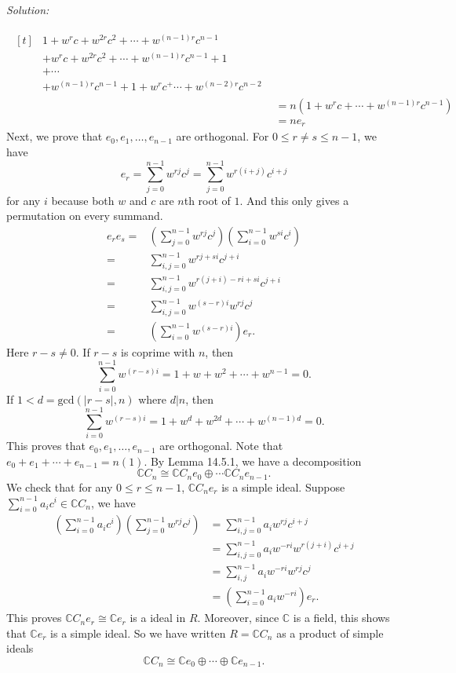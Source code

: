 \documentclass[a4paper, 12pt]{article}
\newenvironment{solution}
    {\textit{Solution:}}
    {}
\begin{document}
\begin{solution}
\begin{enumerate}[(1)]
\begin{align*}
\begin{aligned}[t]
            &1+w^r c+w^{2r} c^2+\cdots+w^{(n-1)r}c^{n-1}\\ 
            &+w^r c+w^{2r} c^2+\cdots +w^{(n-1)r}c^{n-1}+1\\ 
            &+\cdots\\ 
            &+w^{(n-1)r}c^{n-1}+1+w^r c^+\cdots+w^{(n-2)r}c^{n-2}
         \end{aligned}\\
         &=n(1+w^r c+\cdots+w^{(n-1)r}c^{n-1})\\ 
         &=ne_r
\end{align*}
Next, we prove that \(e_0,e_1,\ldots,e_{n-1}\) are orthogonal. For \(0\leq r\neq s\leq n-1\), we have
\[e_r=\sum_{j=0}^{n-1}w^{rj}c^j=\sum_{j=0}^{n-1}w^{r(i+j)}c^{i+j}\] 
for any \(i\) because both \(w\) and \(c\) are \(n\)th root of \(1\). And this only gives a permutation on every summand. 
\begin{align*}
    e_re_s=&(\sum_{j=0}^{n-1}w^{rj}c^j)(\sum_{i=0}^{n-1}w^{si}c^i)\\
          =&\sum_{i,j=0}^{n-1}w^{rj+si}c^{j+i}\\ 
          =&\sum_{i,j=0}^{n-1}w^{r(j+i)-ri+si}c^{j+i}\\ 
          =&\sum_{i,j=0}^{n-1}w^{(s-r)i}w^{rj}c^j\\ 
          =&(\sum_{i=0}^{n-1}w^{(s-r)i})e_r.
\end{align*}
Here \(r-s\neq 0\). If \(r-s\) is coprime with \(n\), then 
\[\sum_{i=0}^{n-1}w^{(r-s)i}=1+w+w^2+\cdots+w^{n-1}=0.\]
If \(1<d=\text{gcd}(|r-s|,n)\) where \(d|n\), then 
\[\sum_{i=0}^{n-1}w^{(r-s)i}=1+w^d+w^{2d}+\cdots+w^{(n-1)d}=0.\]
This proves that \(e_0,e_1,\ldots,e_{n-1}\) are orthogonal. Note that \(e_0+e_1+\cdots +e_{n-1}=n(1)\). By Lemma 14.5.1, we have a decomposition 
\[\mathbb{C}C_n\cong \mathbb{C}C_n e_0\oplus \cdots \mathbb{C}C_ne_{n-1}.\]
We check that for any \(0\leq r\leq n-1\), \(\mathbb{C}C_ne_r\) is a simple ideal. Suppose \(\sum_{i=0}^{n-1}a_ic^i\in \mathbb{C}C_n\), we have 
\begin{align*}
    (\sum_{i=0}^{n-1}a_ic^i)(\sum_{j=0}^{n-1}w^{rj}c^j)&= \sum_{i,j=0}^{n-1}a_iw^{rj}c^{i+j}\\ 
                                                       &=\sum_{i,j=0}^{n-1}a_iw^{-ri}w^{r(j+i)}c^{i+j}\\ 
                                                       &=\sum_{i,j}^{n-1}a_iw^{-ri}w^{rj}c^j\\ 
                                                       &=(\sum_{i=0}^{n-1}a_iw^{-ri})e_r.
\end{align*}
This proves \(\mathbb{C}C_ne_r\cong \mathbb{C}e_r\) is a ideal in \(R\). Moreover, since \(\mathbb{C}\) is a field, this shows that \(\mathbb{C}e_r\) is a simple ideal. So we have written \(R=\mathbb{C}C_n\) as a product of simple ideals 
\[\mathbb{C}C_n\cong \mathbb{C}e_0\oplus \cdots\oplus \mathbb{C}e_{n-1}.\] 


\end{enumerate}
\end{solution}
\end{document}
